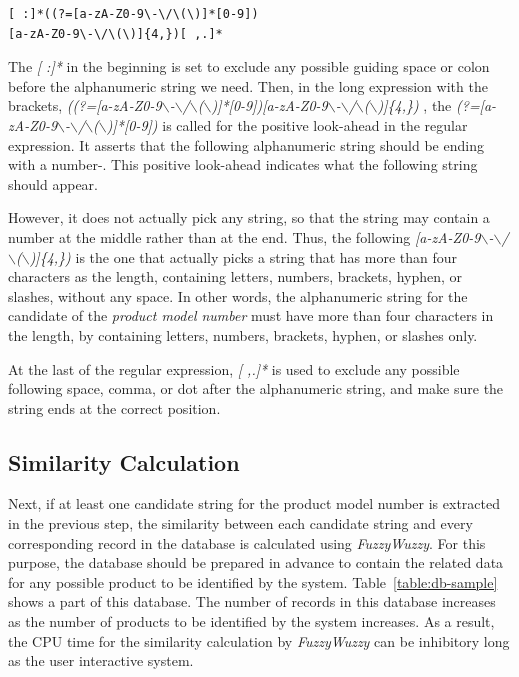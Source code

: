 \documentclass[technicalreport]{ieicej}
\begin{document}
            \begin{center}
            \begin{BVerbatim}
[ :]*((?=[a-zA-Z0-9\-\/\(\)]*[0-9])
[a-zA-Z0-9\-\/\(\)]{4,})[ ,.]*
            \end{BVerbatim}
            \end{center}
    
        The {\em [ :]*} in the beginning is set to exclude any possible guiding space or colon before the alphanumeric string we need. Then, in the long expression with the brackets, {\em ((?=[a-zA-Z0-9$\backslash$-$\backslash$/$\backslash$($\backslash$)]*[0-9])[a-zA-Z0-9$\backslash$-$\backslash$/$\backslash$($\backslash$)]\{4,\}) }, the {\em (?=[a-zA-Z0-9$\backslash$-$\backslash$/$\backslash$($\backslash$)]*[0-9])} is called for the positive look-ahead in the regular expression. It asserts that the following alphanumeric string should be ending with a number\cite{lookahead}-\cite{regex-tutorial}. This positive look-ahead indicates what the following string should appear. 

        However, it does not actually pick any string, so that the string may contain a number at the middle rather than at the end. Thus, the following {\em [a-zA-Z0-9$\backslash$-$\backslash$/$\backslash$($\backslash$)]\{4,\})} is the one that actually picks a string that has more than four characters as the length, containing letters, numbers, brackets, hyphen, or slashes, without any space. In other words, the alphanumeric string for the candidate of the {\em product model number} must have more than four characters in the length, by containing letters, numbers, brackets, hyphen, or slashes only.

        At the last of the regular expression, {\em [ ,.]*} is used to exclude any possible following space, comma, or dot after the alphanumeric string, and make sure the string ends at the correct position.

        
    \subsection{Similarity Calculation}
    \label{sec:algorithm.ocrregex}
        Next, if at least one candidate string for the product model number is extracted in the previous step, the similarity between each candidate string and every corresponding record in the database is calculated using {\em FuzzyWuzzy}. For this purpose, the database should be prepared in advance to contain the related data for any possible product to be identified by the system. Table~\ref{table:db-sample} shows a part of this database. The number of records in this database increases as the number of products to be identified by the system increases. As a result, the CPU time for the similarity calculation by {\em FuzzyWuzzy} can be inhibitory long as the user interactive system.
\end{document}

